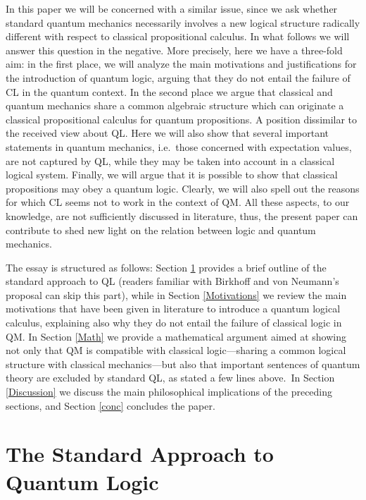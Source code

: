 \documentclass[11pt, executivepaper]{article}
\begin{document}
In this paper we will be concerned with a similar issue, since we ask whether standard quantum mechanics necessarily involves a new logical structure radically different with respect to classical propositional calculus. In what follows we will answer this question in the negative. More precisely, here we have a three-fold aim: in the first place, we will analyze the main motivations and justifications for the introduction of quantum logic, arguing that they do not entail the failure of CL in the quantum context. In the second place we argue that classical and quantum mechanics share a common algebraic structure which can originate a classical propositional calculus for quantum propositions. A position dissimilar to the received view about QL. Here we will also show that several important statements in quantum mechanics, i.e.\ those concerned with expectation values, are not captured by QL, while they may be taken into account in a classical logical system. Finally, we will argue that it is possible to show that classical propositions may obey a quantum logic. Clearly, we will also spell out the reasons for which CL seems not to work in the context of QM. All these aspects, to our knowledge, are not sufficiently discussed in literature, thus, the present paper can contribute to shed new light on the relation between logic and quantum mechanics.
\vspace{2mm}

The essay is structured as follows: Section \ref{QL} provides a brief outline of the standard approach to QL (readers familiar with Birkhoff and von Neumann's proposal can skip this part), while in Section \ref{Motivations} we review the main motivations that have been given in literature to introduce a quantum logical calculus, explaining also why they do not entail the failure of classical logic in QM. In Section \ref{Math} we provide a mathematical argument aimed at showing not only that QM is compatible with classical logic---sharing a common logical structure with classical mechanics---but also that important sentences of quantum theory are excluded by standard QL, as stated a few lines above.\ In Section \ref{Discussion} we discuss the main philosophical implications of the preceding sections, and Section \ref{conc} concludes the paper.


\section{The Standard Approach to Quantum Logic}
\label{QL}
\end{document}

